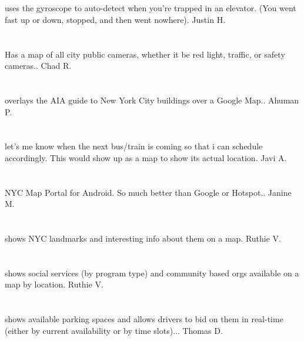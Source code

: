 \section{}uses the gyroscope to auto-detect when you're trapped in an elevator. (You went fast up or down,  stopped,  and then went nowhere). Justin H.
\section{}Has a map of all city public cameras,  whether it be red light,  traffic,  or safety cameras.. Chad R.
\section{} overlays the AIA guide to New York City buildings over a Google Map.. Ahuman P.
\section{}let's me know when the next bus/train is  coming so that i can schedule accordingly. This would show up as a map to show its actual location. Javi A.
\section{}NYC Map Portal for Android. So much better than Google or Hotspot.. Janine M.
\section{}shows NYC landmarks and interesting info about them on a map. Ruthie V.
\section{}shows social services (by program type) and community based orgs available on a map by location. Ruthie V.
\section{}shows available parking spaces and allows drivers to bid on them in real-time (either by current availability or by time slots)... Thomas D.
